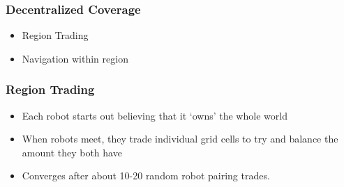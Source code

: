 \documentclass{beamer}
\begin{document}
	\begin{frame}
		\frametitle{Decentralized Coverage}
		\begin{itemize}
			\item Region Trading
			\item Navigation within region
		\end{itemize}
	\end{frame}
	
	\begin{frame}
		\frametitle{Region Trading}
		\begin{itemize}
			\item Each robot starts out believing that it `owns' the whole world
			\item When robots meet, they trade individual grid cells to try and balance the amount they both have
			\item Converges after about 10-20 random robot pairing trades.
		\end{itemize}
		
	\end{frame}
	
\end{document}
